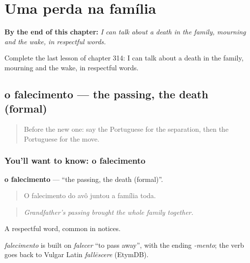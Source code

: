 
\chapter{Uma perda na família}
\label{ch:pt-uma-perda-na-familia}

\begin{chapteropening}
\textbf{By the end of this chapter:} \emph{I can talk about a death in the family, mourning and the wake, in respectful words.}

Complete the last lesson of chapter 314: I can talk about a death in the family, mourning and the wake, in respectful words.
\end{chapteropening}

\section[o falecimento]{o falecimento — the passing, the death (formal)}

\label{lesson:PT-C314-falecimento}



\begin{quote}
Before the new one: say the Portuguese for the separation, then the Portuguese for the move.
\end{quote}

\subsection*{You'll want to know: o falecimento}
\textbf{o falecimento} — \textquotedblleft{}the passing, the death (formal)\textquotedblright{}.

\begin{quote}
O falecimento do avô juntou a família toda.
\end{quote}

\begin{quote}
\emph{Grandfather’s passing brought the whole family together.}
\end{quote}

A respectful word, common in notices.

\begin{cousinweb}
\emph{falecimento} is built on \emph{falecer} \textquotedblleft{}to pass away\textquotedblright{}, with the ending \emph{-mento}; the verb goes back to Vulgar Latin \emph{fallēscere} (EtymDB).
\end{cousinweb}

